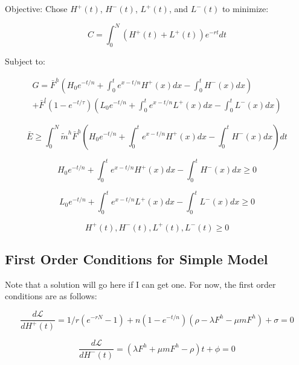 \documentclass[singlespace]{easychithesis}
\newcommand{\Lagr}{\mathcal{L}}
\begin{document}
Objective: Chose $H^+(t)$, $H^-(t)$, $L^+(t)$, and $L^-(t)$ to minimize:

\begin{equation}
C = \int_0^N (H^+(t) + L^+(t))e^{-rt} dt
\end{equation}

Subject to: 

\begin{multline}
G = \bar{F}^h\left (H_0 e^{-t/n} + \int_0^t e^{x-t/n} H^+(x) dx - \int_0^t H^-(x)dx \right) \\ + \bar{F}^l(1-e^{-t/\tau}) \left ( L_0 e^{-t/n} + \int_0^t e^{x-t/n} L^+(x) dx - \int_0^t L^-(x)dx\right )
\end{multline}

\begin{equation}
\bar{E} \geq \int_0^N  \tilde{m}^h \bar{F}^h\left (H_0 e^{-t/n} + \int_0^t e^{x-t/n} H^+(x) dx - \int_0^t H^-(x)dx \right) dt
\end{equation}

\begin{equation}
H_0 e^{-t/n} + \int_0^t e^{x-t/n} H^+(x) dx - \int_0^t H^-(x)dx \geq 0 
\end{equation}

\begin{equation}
L_0 e^{-t/n} + \int_0^t e^{x-t/n} L^+(x) dx - \int_0^t L^-(x)dx \geq 0 
\end{equation}

\begin{equation}
H^+(t), H^-(t), L^+(t), L^-(t) \geq 0
\end{equation}


\subsection{First Order Conditions for Simple Model}

Note that a solution will go here if I can get one. For now, the first order conditions are as follows:

\begin{equation}
\frac{d\Lagr}{dH^+(t)} = 1/r(e^{-rN} -1) + n(1-e^{-t/n})(\rho - \lambda F^h -\mu m F^h) + \sigma = 0
\end{equation}

\begin{equation}
\frac{d\Lagr}{dH^-(t)} = (\lambda F^h +\mu m F^h - \rho)t + \phi = 0
\end{equation}
\end{document}
